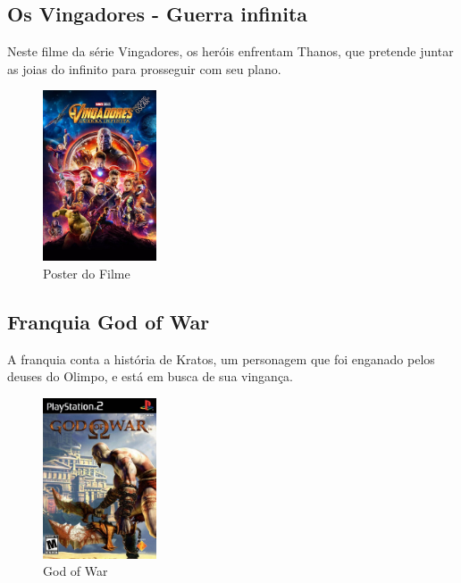 \subsection{Os Vingadores - Guerra infinita}

Neste filme da série Vingadores, os heróis enfrentam Thanos, que pretende juntar as joias do infinito para prosseguir com seu plano.

\begin{figure}[!htb] \caption{\label{vingadores}Poster do Filme} \begin{center}
\includegraphics[width=0.3\textwidth]{imagens/vingadores.jpeg} \end{center}
 \end{figure}

\subsection{Franquia God of War}
A franquia conta a história de Kratos, um personagem que foi enganado pelos deuses do Olimpo, e está em busca de sua vingança.


\clearpage

\begin{figure}[!htb] \caption{\label{god_of_war}God of War} \begin{center}
\includegraphics[width=0.3\textwidth]{imagens/GodofWar.jpg} \end{center}
 \end{figure}


